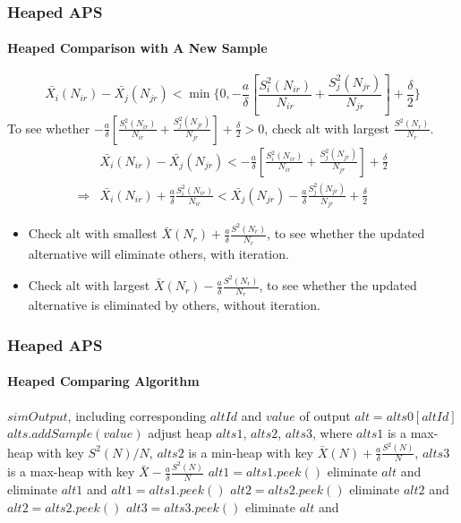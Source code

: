 \documentclass{beamer}
\begin{document}
\begin{frame}
\frametitle{Heaped APS}
\framesubtitle{Heaped Comparison with A New Sample}
$$ \bar{X_{i}}(N_{ir}) - \bar{X_{j}}(N_{jr}) < \min\{0, -\frac{a}{\delta}[\frac{S_i^2(N_{ir})}{N_{ir}} + \frac{S_j^2(N_{jr})}{N_{jr}}] + \frac{\delta}{2}\} $$
To see whether $ -\frac{a}{\delta}[\frac{S_i^2(N_{ir})}{N_{ir}} + \frac{S_j^2(N_{jr})}{N_{jr}}] + \frac{\delta}{2} > 0$, check alt with largest $\frac{S^2(N_r)}{N_r}$.
\begin{align*}
& \bar{X_{i}}(N_{ir}) - \bar{X_{j}}(N_{jr}) < -\frac{a}{\delta}[\frac{S_i^2(N_{ir})}{N_{ir}} + \frac{S_j^2(N_{jr})}{N_{jr}}] + \frac{\delta}{2} \\
\Longrightarrow & \bar{X_{i}}(N_{ir}) + \frac{a}{\delta}\frac{S_i^2(N_{ir})}{N_{ir}} < \bar{X_{j}}(N_{jr}) - \frac{a}{\delta}\frac{S_j^2(N_{jr})}{N_{jr}} + \frac{\delta}{2}
\end{align*}
\begin{itemize}
\item Check alt with smallest $\bar{X}(N_r) + \frac{a}{\delta}\frac{S^2(N_r)}{N_r}$, to see whether the updated alternative will eliminate others, with iteration.
\item Check alt with largest $\bar{X}(N_r) - \frac{a}{\delta}\frac{S^2(N_r)}{N_r}$, to see whether the updated alternative is eliminated by others, without iteration.
\end{itemize}
\end{frame}

\begin{frame}
\frametitle{Heaped APS}
\framesubtitle{Heaped Comparing Algorithm}
\begin{algorithmic}[1]
\tiny
{
\Require $simOutput$, including corresponding $altId$ and $value$ of output
\State $alt = alts0[altId]$ 
  \State \Return
\EndIf
\State $alts.addSample(value)$ 
\State adjust heap $alts1$, $alts2$, $alts3$, {\color{blue} where $alts1$ is a max-heap with key $S^2(N)/N$, $alts2$ is a min-heap with key $\bar{X}(N) + \frac{a}{\delta}\frac{S^2(N)}{N}$, $alts3$ is a max-heap with key $\bar{X} - \frac{a}{\delta}\frac{S^2(N)}{N}$} 
\State $alt1 = alts1.peek()$
    \State eliminate $alt$ and \Return {}
  \Else
    \State eliminate $alt1$ and $alt1 = alts1.peek()$ 
  \EndIf
\EndWhile
\State $alt2 = alts2.peek()$
  \State eliminate $alt2$ and $alt2 = alts2.peek()$ 
\EndWhile
\State $alt3 = alts3.peek()$
  \State eliminate $alt$ and \Return {}
\EndIf
}
\end{algorithmic}
\end{frame}
\end{document}
